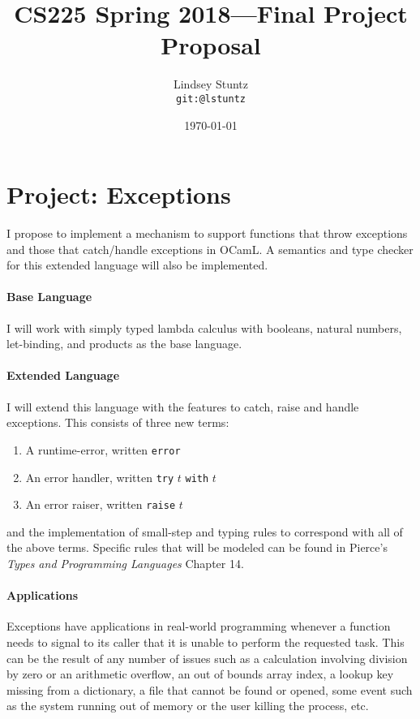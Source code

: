 \documentclass{article}
\title{CS225 Spring 2018---Final Project Proposal}
\author{
  Lindsey Stuntz \\ \small{\texttt{git:@lstuntz}}
}
\date{\today}
\begin{document}
\maketitle

\section*{Project: Exceptions}

I propose to implement a mechanism to support functions that throw exceptions 
and those that catch/handle exceptions in OCamL.  A semantics and type 
checker for this extended language will also be implemented.

\paragraph{Base Language}

I will work with simply typed lambda calculus with booleans, natural numbers,
let-binding, and products as the base language.

\paragraph{Extended Language}

I will extend this language with the features to catch, raise and handle exceptions.
This consists of three new terms:
\begin{enumerate}
\item A runtime-error, written \texttt{error}
\item An error handler, written \texttt{try}  $t$ \texttt{with} $t$
\item An error raiser, written \texttt{raise}  $t$
\end{enumerate}
and the implementation of small-step and typing rules to correspond with all of the 
above terms. Specific rules that will be modeled can be found in Pierce's 
\emph{Types and Programming Languages} Chapter 14.

\paragraph{Applications}

Exceptions have applications in real-world programming whenever a function needs to 
signal to its caller that it is unable to perform the requested task. This can be the 
result of any number of issues such as a calculation involving division by zero or
an arithmetic overflow, an out of bounds array index, a lookup key missing from a
dictionary, a file that cannot be found or opened, some event such as the system
running out of memory or the user killing the process, etc.
\end{document}
